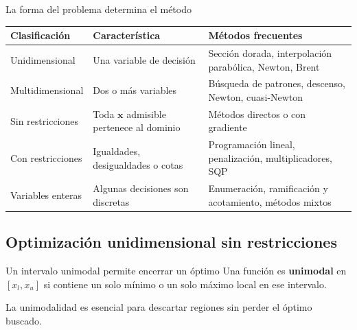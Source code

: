 \documentclass[../../main.tex]{subfiles}
\begin{document}
\begin{frame}{La forma del problema determina el método}
\small
\begin{tabular}{p{}p{}p{}}
\toprule
\textbf{Clasificación} & \textbf{Característica} & \textbf{Métodos frecuentes}\\
\midrule
Unidimensional & Una variable de decisión & Sección dorada, interpolación parabólica, Newton, Brent\\
Multidimensional & Dos o más variables & Búsqueda de patrones, descenso, Newton, cuasi-Newton\\
Sin restricciones & Toda $\mathbf{x}$ admisible pertenece al dominio & Métodos directos o con gradiente\\
Con restricciones & Igualdades, desigualdades o cotas & Programación lineal, penalización, multiplicadores, SQP\\
Variables enteras & Algunas decisiones son discretas & Enumeración, ramificación y acotamiento, métodos mixtos\\
\bottomrule
\end{tabular}
\end{frame}


\subsection{Optimización unidimensional sin restricciones}

\begin{frame}{Un intervalo unimodal permite encerrar un óptimo}
Una función es \textbf{unimodal} en $[x_l,x_u]$ si contiene un solo mínimo o un solo máximo local en ese intervalo.

\begin{center}
\end{center}

La unimodalidad es esencial para descartar regiones sin perder el óptimo buscado.
\end{frame}
\end{document}
